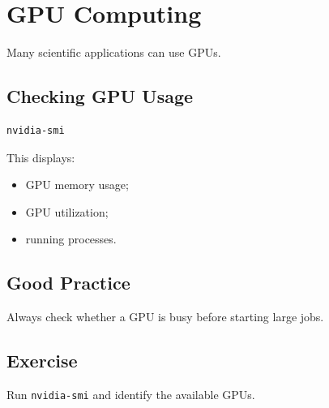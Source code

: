 \section{GPU Computing}

Many scientific applications can use GPUs.

\subsection{Checking GPU Usage}

\begin{lstlisting}
nvidia-smi
\end{lstlisting}

This displays:

\begin{itemize}
\item GPU memory usage;
\item GPU utilization;
\item running processes.
\end{itemize}

\subsection{Good Practice}

Always check whether a GPU is busy before starting large jobs.

\subsection{Exercise}

Run \texttt{nvidia-smi} and identify the available GPUs.
